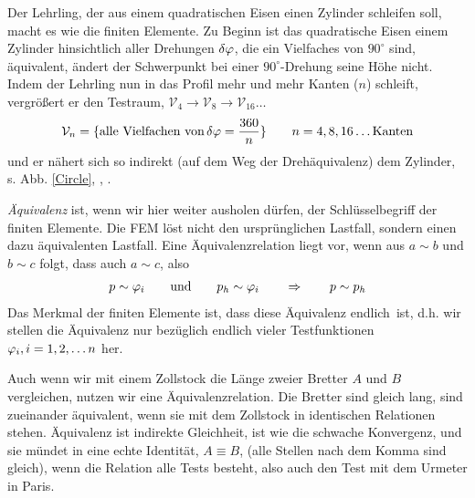 Der Lehrling, der aus einem quadratischen Eisen einen Zylinder schleifen soll, macht es wie die finiten Elemente. Zu Beginn ist das quadratische Eisen einem Zylinder hinsichtlich aller Drehungen $\delta \varphi$, die ein Vielfaches von $90^\circ$ sind, \"{a}quivalent, \"{a}ndert der Schwerpunkt bei einer $90^\circ$-Drehung seine H\"{o}he nicht. Indem der Lehrling nun in das Profil mehr und mehr Kanten ($n$) schleift, vergr\"{o}{\ss}ert er den Testraum, $\mathcal{V}_4 \to \mathcal{V}_8 \to \mathcal{V}_{16} \ldots$
\begin{align}
\mathcal{V}_n = \{\text{alle Vielfachen von} \,\delta \varphi = \frac{360}{n}\} \qquad n = 4, 8, 16 \ldots \text{Kanten}
\end{align}
und er n\"{a}hert sich so indirekt (auf dem Weg der \glq Dreh\"{a}quivalenz\grq{}) dem Zylinder, s. Abb. \ref{Circle}, \cite{Ha4}, \cite{Ha5}.

{\em \"{A}quivalenz\/} ist, wenn wir hier weiter ausholen d\"{u}rfen, der Schl\"{u}sselbegriff der finiten Elemente. Die FEM l\"{o}st nicht den urspr\"{u}nglichen Lastfall, sondern einen dazu \"{a}quivalenten Lastfall. Eine \"{A}quivalenzrelation liegt vor, wenn aus $a \sim b $ und $b \sim c $ folgt, dass auch $a \sim c$, also
\begin{align}
p \sim \varphi_i \qquad \text{und} \qquad p_h \sim \varphi_i \qquad \Rightarrow \qquad p \sim p_h
\end{align}
Das Merkmal der finiten Elemente ist, dass diese \"{A}quivalenz \glq endlich\grq\ ist, d.h. wir stellen die \"{A}quivalenz nur bez\"{u}glich endlich vieler Testfunktionen $\varphi_i, i = 1,2,\ldots n$ her.

Auch wenn wir mit einem Zollstock die L\"{a}nge zweier Bretter $A$ und $B$ vergleichen, nutzen wir eine \"{A}quivalenzrelation. Die Bretter sind gleich lang, sind zueinander \"{a}quivalent, wenn sie mit dem Zollstock in identischen Relationen stehen. \"{A}quivalenz ist indirekte Gleichheit, ist wie die schwache Konvergenz, und sie m\"{u}ndet in eine echte Identit\"{a}t, $A \equiv B$, (alle Stellen nach dem Komma sind gleich), wenn die Relation alle Tests besteht, also auch den Test mit dem Urmeter in Paris.\\

